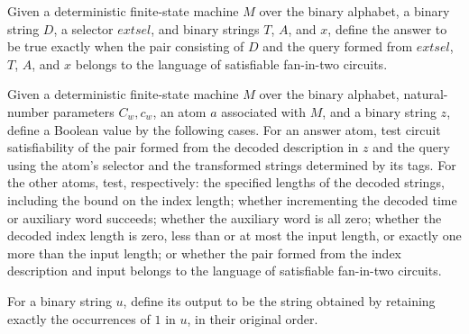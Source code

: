 \begin{definition}
\label{Complexity.Meyer.ansD}
\leanok
{}
Given a deterministic finite-state machine $M$ over the binary alphabet, a binary string
$D$, a selector $	ext{sel}$, and binary strings $T$, $A$, and $x$, define the answer to
be true exactly when the pair consisting of $D$ and the query formed from $	ext{sel}$,
$T$, $A$, and $x$ belongs to the language of satisfiable fan-in-two circuits.
\end{definition}

\begin{definition}
\label{Complexity.Meyer.evalAtom}
\leanok
{}
Given a deterministic finite-state machine $M$ over the binary alphabet, natural-number
parameters $C_w,c_w$, an atom $a$ associated with $M$, and a binary string $z$, define a
Boolean value by the following cases. For an answer atom, test circuit satisfiability of
the pair formed from the decoded description in $z$ and the query using the atom's
selector and the transformed strings determined by its tags. For the other atoms, test,
respectively: the specified lengths of the decoded strings, including the bound on the
index length; whether incrementing the decoded time or auxiliary word succeeds; whether
the auxiliary word is all zero; whether the decoded index length is zero, less than or
at most the input length, or exactly one more than the input length; or whether the pair
formed from the index description and input belongs to the language of satisfiable
fan-in-two circuits.
\end{definition}

\begin{definition}
\label{Complexity.Meyer.trues}
\leanok
{}
For a binary string $u$, define its output to be the string obtained by retaining
exactly the occurrences of $1$ in $u$, in their original order.
\end{definition}

